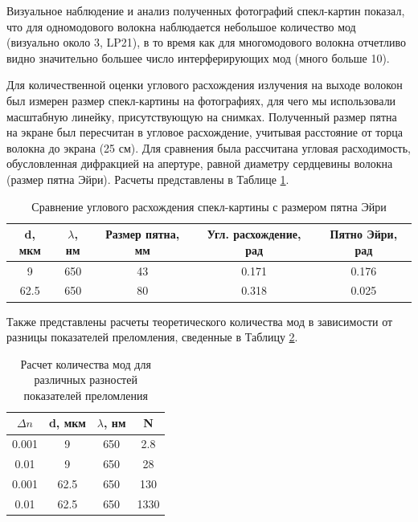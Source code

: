Визуальное наблюдение и анализ полученных фотографий спекл-картин показал, что для одномодового волокна наблюдается небольшое количество мод (визуально около 3, LP21), в то время как для многомодового волокна отчетливо видно значительно большее число интерферирующих мод (много больше 10).

Для количественной оценки углового расхождения излучения на выходе волокон был измерен размер спекл-картины на фотографиях, для чего мы использовали масштабную линейку, присутствующую на снимках. Полученный размер пятна на экране был пересчитан в угловое расхождение, учитывая расстояние от торца волокна до экрана (25 см). Для сравнения была рассчитана угловая расходимость, обусловленная дифракцией на апертуре, равной диаметру сердцевины волокна (размер пятна Эйри). Расчеты представлены в Таблице \ref{tab:speckle_comparison}.

\begin{longtable}[c]{|c|c|c|c|c|}
    \caption{Сравнение углового расхождения спекл-картины с размером пятна Эйри}
    \label{tab:speckle_comparison}\\
    \hline
    \rowcolor[HTML]{32CB00}
    d, мкм & $\lambda$, нм & Размер пятна, мм & Угл. расхождение, рад & Пятно Эйри, рад \\ \hline
    \endfirsthead
    \endhead
    9 & 650 & 43 & 0.171 & 0.176 \\ \hline
    62.5 & 650 & 80 & 0.318 & 0.025 \\ \hline
\end{longtable}

Также представлены расчеты теоретического количества мод в зависимости от разницы показателей преломления, сведенные в Таблицу \ref{tab:mode_calculation}.

\begin{longtable}[c]{|c|c|c|c|}
    \caption{Расчет количества мод для различных разностей показателей преломления}
    \label{tab:mode_calculation}\\
    \hline
    \rowcolor[HTML]{32CB00}
    $\Delta n$ & d, мкм & $\lambda$, нм & N \\ \hline
    \endfirsthead
    \endhead
    0.001 & 9 & 650 & 2.8 \\ \hline
    0.01 & 9 & 650 & 28 \\ \hline
    0.001 & 62.5 & 650 & 130 \\ \hline
    0.01 & 62.5 & 650 & 1330 \\ \hline
\end{longtable}

